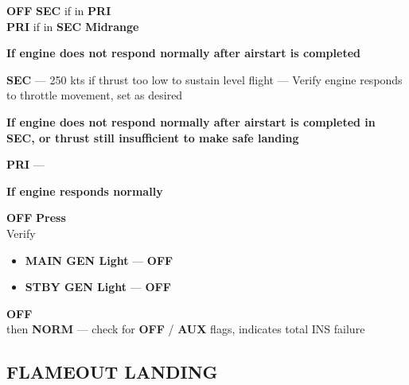 \begin{checklistenumerate}[resume]
    \blueitem[Throttle]\dotfill \textbf{OFF}
    \dotfill \textbf{SEC} if in \textbf{PRI}\\
    \hfill \textbf{PRI} if in \textbf{SEC}
    \blueitem[Throttle]\dotfill \textbf{Midrange}
\end{checklistenumerate}

\clearpage

\textbf{If engine does not respond normally after airstart is completed}

\begin{checklistenumerate}[resume]
    \dotfill \textbf{SEC}
    \blueitem[Airspeed] --- 250 kts if thrust too low to sustain level flight
    \blueitem[Throttle] --- Verify engine responds to throttle movement, set as desired
\end{checklistenumerate}

\textbf{%
    If engine does not respond normally after airstart is completed in SEC, 
    or thrust still insufficient to make safe landing
}

\begin{checklistenumerate}[resume]
    \dotfill \textbf{PRI}
     --- 
\end{checklistenumerate}

\textbf{If engine responds normally}

\begin{checklistenumerate}[resume]
    \dotfill \textbf{OFF}
    \dotfill \textbf{Press}\\
    Verify
    \begin{itemize}
        \item \textbf{MAIN GEN Light} --- \textbf{OFF}
        \item \textbf{STBY GEN Light} --- \textbf{OFF}
    \end{itemize}
    \dotfill \textbf{OFF}\\
    \hfill then \textbf{NORM}
    \blueitem[ADI] --- check for \textbf{OFF} / \textbf{AUX} flags,
    indicates total INS failure
\end{checklistenumerate}


\marginfigrestore

\subsection{FLAMEOUT LANDING}
\label{subsec:proc_em:landing:flameout}

